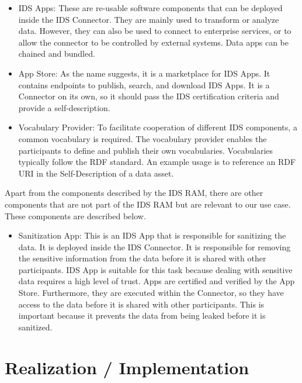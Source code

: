 \documentclass{article}
\begin{document}
\begin{itemize}
    \item IDS Apps: These are re-usable software components that can be deployed inside the IDS Connector. They are mainly used to transform or analyze data. However, they can also be used to connect to enterprise services, or to allow the connector to be controlled by external systems. Data apps can be chained and bundled.
    \item App Store: As the name suggests, it is a marketplace for IDS Apps. It contains endpoints to publish, search, and download IDS Apps. It is a Connector on its own, so it should pass the IDS certification criteria and provide a self-description.
    \item Vocabulary Provider: To facilitate cooperation of different IDS components, a common vocabulary is required. The vocabulary provider enables the participants to define and publish their own vocabularies. Vocabularies typically follow the RDF standard. An example usage is to reference an RDF URI in the Self-Description of a data asset.
\end{itemize}

Apart from the components described by the IDS RAM, there are other components that are not part of the IDS RAM but are relevant to our use case. These components are described below.

\begin{itemize}
    \item Sanitization App: This is an IDS App that is responsible for sanitizing the data. It is deployed inside the IDS Connector. It is responsible for removing the sensitive information from the data before it is shared with other participants. IDS App is suitable for this task because dealing with sensitive data requires a high level of trust. Apps are certified and verified by the App Store. Furthermore, they are executed within the Connector, so they have access to the data before it is shared with other participants. This is important because it prevents the data from being leaked before it is sanitized. 
\end{itemize}

\section{Realization / Implementation} %

\end{document}
